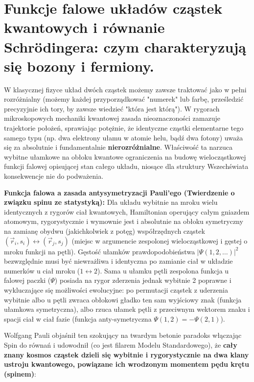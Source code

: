 \documentclass[11pt, a4paper]{article}
\begin{document}
\section{Funkcje falowe układów cząstek kwantowych i równanie Schrödingera: czym charakteryzują się bozony i fermiony.}

W klasycznej fizyce układ dwóch cząstek możemy zawsze traktować jako w pełni rozróżnialny (możemy każdej przyporządkować "numerek" lub farbę, prześledzić precyzyjnie ich tory, by zawsze wiedzieć "która jest którą").
W rygorach mikroskopowych mechaniki kwantowej zasada nieoznaczoności zamazuje trajektorie położeń, sprawiając potężnie, że identyczne cząstki elementarne tego samego typu (np. dwa elektrony ułamu w atomie helu, bądź dwa fotony) uważa się za absolutnie i fundamentalnie \textbf{nierozróżnialne}. Właściwość ta narzuca wybitne ułamkowe na obłoku kwantowe ograniczenia na budowę wielocząstkowej funkcji falowej opisującej stan całego układu, niosące dla struktury Wszechświata konsekwencje nie do podważenia.

\textbf{Funkcja falowa a zasada antysymetryzacji Pauli'ego (Twierdzenie o związku spinu ze statystyką):}
Dla układu wybitnie na mroku wielu identycznych z rygorów ciał kwantowych, Hamiltonian operujący całym gniazdem atomowym, rygorystycznie i wymownie jest i absolutnie na obłoku symetryczny na zamianę obydwu (jakichkolwiek z potęg) współrzędnych cząstek $(\vec{r}_i, s_i) \leftrightarrow (\vec{r}_j, s_j)$ (miejsc w argumencie zespolonej wielocząstkowej i gęstej o mroku funkcji na pętli). Gęstość ułamków prawdopodobieństwa $|\Psi(1, 2, \dots)|^2$ bezwzględnie musi być niewrażliwa i identyczna po zamianie ciał w układzie numerków u ciał mroku ($1 \leftrightarrow 2$). Sama u ułamku pętli zespolona funkcja u falowej paczki ($\Psi$) posiada na rygor zderzenia jednak wybitnie 2 poprawne i wykluczające się możliwości ewolucyjne: po permutacji cząstek z uderzenia wybitnie albo u pętli zwraca obłokowi gładko ten sam wyjściowy znak (funkcja ułamkowa symetryczna), albo rzuca ułamek pętli z przeciwnym wektorem znaku i spacji ciał w ciał fazie (funkcja anty-symetryczna $\Psi(1,2) = -\Psi(2,1)$).

Wolfgang Pauli objaśnił ten szokujący na twardym betonie paradoks włączając Spin do równań i udowodnił (co jest filarem Modelu Standardowego), że \textbf{cały znany kosmos cząstek dzieli się wybitnie i rygorystycznie na dwa klany ustroju kwantowego, powiązane ich wrodzonym momentem pędu krętu (spinem)}:
\end{document}
